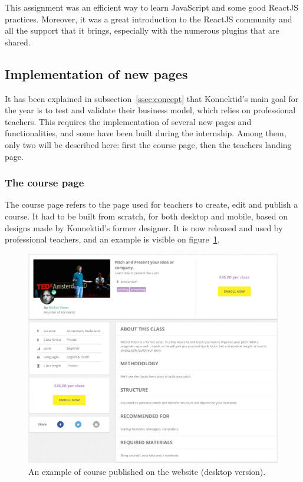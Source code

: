 This assignment was an efficient way to learn JavaScript and some good ReactJS practices. Moreover, it was a great introduction to the ReactJS community and all the support that it brings, especially with the numerous plugins that are shared.

\subsection{Implementation of new pages}
\label{ssec:new_pages}

It has been explained in {\sc subsection}~\ref{ssec:concept} that Konnektid's main goal for the year is to test and validate their business model, which relies on
professional teachers. This requires the implementation of several new pages and functionalities, and some have been built during the internship. Among them, only
two will be described here: first the course page, then the teachers landing page.

\subsubsection{The course page}
\label{sssec:coursePage}

The course page refers to the page used for teachers to create, edit and publish a course. It had to be built from scratch, for both desktop and mobile, based on designs
made by Konnektid's former designer. It is now released and used by professional teachers, and an example is visible on {\sc figure}~\ref{fig:coursePage}.

\begin{figure}[H]
    \centering
    \includegraphics[scale=0.2]{figure/coursePage.png}
    \caption{An example of course published on the website (desktop version).}
    \label{fig:coursePage}
\end{figure}

